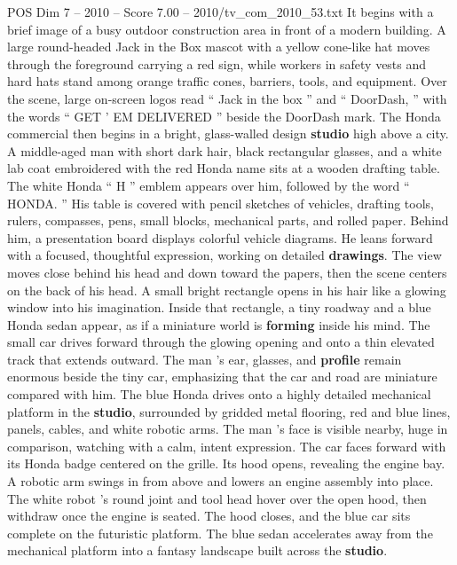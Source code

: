 \begin{textsample}{POS Dim 7 – 2010 – Score 7.00 – 2010/tv\_com\_2010\_53.txt}  \label{ex:f7_pos_056}
It begins with a brief image of a busy outdoor construction area in front of a modern building.
A large round-headed Jack in the Box mascot with a yellow cone-like hat moves through the foreground carrying a red sign, while workers in safety vests and hard hats stand among orange traffic cones, barriers, tools, and equipment.
Over the scene, large on-screen logos read “ Jack in the box ” and “ DoorDash, ” with the words “ GET ’ EM DELIVERED ” beside the DoorDash mark.
The Honda commercial then begins in a bright, glass-walled design \textbf{studio} high above a city.
A middle-aged man with short dark hair, black rectangular glasses, and a white lab coat embroidered with the red Honda name sits at a wooden drafting table.
The white Honda “ H ” emblem appears over him, followed by the word “ HONDA. ” His table is covered with pencil sketches of vehicles, drafting tools, rulers, compasses, pens, small blocks, mechanical parts, and rolled paper.
Behind him, a presentation board displays colorful vehicle diagrams.
He leans forward with a focused, thoughtful expression, working on detailed \textbf{drawings}.
The view moves close behind his head and down toward the papers, then the scene centers on the back of his head.
A small bright rectangle opens in his hair like a glowing window into his imagination.
Inside that rectangle, a tiny roadway and a blue Honda sedan appear, as if a miniature world is \textbf{forming} inside his mind.
The small car drives forward through the glowing opening and onto a thin elevated track that extends outward.
The man ’s ear, glasses, and \textbf{profile} remain enormous beside the tiny car, emphasizing that the car and road are miniature compared with him.
The blue Honda drives onto a highly detailed mechanical platform in the \textbf{studio}, surrounded by gridded metal flooring, red and blue lines, panels, cables, and white robotic arms.
The man ’s face is visible nearby, huge in comparison, watching with a calm, intent expression.
The car faces forward with its Honda badge centered on the grille.
Its hood opens, revealing the engine bay.
A robotic arm swings in from above and lowers an engine assembly into place.
The white robot ’s round joint and tool head hover over the open hood, then withdraw once the engine is seated.
The hood closes, and the blue car sits complete on the futuristic platform.
The blue sedan accelerates away from the mechanical platform into a fantasy landscape built across the \textbf{studio}.

\end{textsample}
